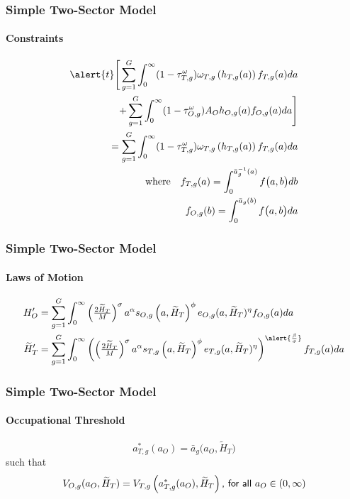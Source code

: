 \documentclass[11pt]{beamer}
\begin{document}
	\begin{frame}
		\frametitle{Simple Two-Sector Model}
		\framesubtitle{Constraints}
		\begin{align*}
			\alert{t}\Bigg[ \sum_{g=1}^G \int_0^\infty (1-\tau^{\omega}_{T,g})\omega_{T,g}\left(h_{T,g}(a)\right) f_{T,g}(a) da  \\
			+ \sum_{g=1}^G \int_0^\infty (1-\tau^{\omega}_{O,g})A_O h_{O,g}(a) f_{O,g}(a) da \Bigg]\\
			= \sum_{g=1}^G \int_0^\infty (1-\tau^{\omega}_{T,g})\omega_{T,g}\left(h_{T,g}(a)\right) f_{T,g}(a) da \\
			{\rm where } \quad  f_{T,g}(a)  = \int_0^{\bar{a}_g^{-1}\left(a\right)} f\big(a,b \big) db \\
			f_{O,g}(b)  = \int_0^{\bar{a}_g\left(b\right)} f\big(a,b \big) da 
		\end{align*}		
	\end{frame}

 \begin{frame}
		\frametitle{Simple Two-Sector Model}
		\framesubtitle{Laws of Motion}
		\begin{align*}
			{H}_{O}' & = \sum_{g=1}^G \int_0^\infty \left(\tfrac{2 \widetilde{H}_T}{M}\right)^\sigma a^\alpha s_{O,g}\left(a,\widetilde{H}_T\right)^\phi e_{O,g}(a,\widetilde{H}_T)^\eta  f_{O,g}(a) da \\
			\widetilde{H}_{T}' & = \sum_{g=1}^G \int_0^\infty \left(\left(\tfrac{2 \widetilde{H}_T}{M}\right)^\sigma a^\alpha s_{T,g}\left(a,\widetilde{H}_T\right)^\phi e_{T,g}(a,\widetilde{H}_T)^\eta \right)^{\alert{\frac{\beta}{\sigma}}} f_{T,g}(a) da 
		\end{align*}
	\end{frame}
	
	\begin{frame}
		\frametitle{Simple Two-Sector Model}
		\framesubtitle{Occupational Threshold}
		\begin{equation*}
			a^*_{T,g}(a_O) = \bar{a}_g\big(a_{O},\widetilde{H}_T\big) %
		\end{equation*}
		such that
		\begin{equation}
			\label{eq:indiff}
			V_{O,g}(a_{O},\widetilde{H}_T) = V_{T,g}\left(a^*_{T,g}(a_O),\widetilde{H}_T\right) \textrm{{\sf , for all} } a_O \in (0,\infty) \nonumber
		\end{equation}
	\end{frame}
	
\end{document}
